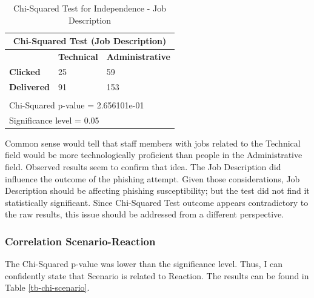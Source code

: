 \documentclass[a4paper]{article}
\begin{document}
\begingroup
\renewcommand{\arraystretch}{1.25}
\begin{table}[ht]
\begin{center}
    \begin{tabular}{ | l | l | l | }
    \hline
    \multicolumn{3}{|c|}{Chi-Squared Test (Job Description)} \\ \hline
    \textbf{} & \textbf{Technical} & \textbf{Administrative} \\
    \hline
    \textbf{Clicked} & 25 & 59 \\ \hline
    \textbf{Delivered} & 91 & 153 \\ \hline
    \multicolumn{3}{l}{} \\ \hline
    \multicolumn{3}{|l|}{Chi-Squared p-value = 2.656101e-01} \\
    \multicolumn{3}{|l|}{Significance level = 0.05} \\ \hline
    \end{tabular}
\end{center}
\caption{Chi-Squared Test for Independence - Job Description}
\label{tb-chi-jobdescr}
\end{table}

\noindent
Common sense would tell that staff members with jobs related to the Technical field would be more technologically proficient than people in the Administrative field. Observed results seem to confirm that idea. The Job Description did influence the outcome of the phishing attempt. Given those considerations, Job Description should be affecting phishing susceptibility; but the test did not find it statistically significant. Since Chi-Squared Test outcome appears contradictory to the raw results, this issue should be addressed from a different perspective.

\subsubsection{Correlation Scenario-Reaction}

The Chi-Squared p-value was lower than the significance level. Thus, I can confidently state that Scenario is related to Reaction. The results can be found in Table \ref{tb-chi-scenario}.

\bigskip
\end{document}
